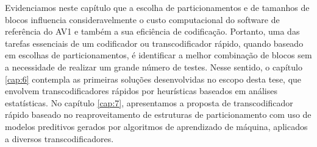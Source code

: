 Evidenciamos neste capítulo que a escolha de particionamentos e de tamanhos de blocos influencia consideravelmente o custo computacional do software de referência do AV1 e também a sua eficiência de codificação. Portanto, uma das tarefas essenciais de um codificador ou transcodificador rápido, quando baseado em escolhas de particionamentos, é identificar a melhor combinação de blocos sem a necessidade de realizar um grande número de testes. Nesse sentido, o capítulo \ref{cap:6} contempla as primeiras soluções desenvolvidas no escopo desta tese, que envolvem transcodificadores rápidos por heurísticas baseados em análises estatísticas. No capítulo \ref{cap:7}, apresentamos a proposta de transcodificador rápido baseado no reaproveitamento de estruturas de particionamento com uso de modelos preditivos gerados por algoritmos de aprendizado de máquina, aplicados a diversos transcodificadores.
